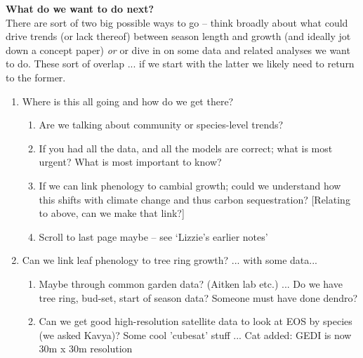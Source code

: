 \documentclass[11pt,letter]{article}
\begin{document}
{\bf What do we want to do next?}\\

There are sort of two big possible ways to go -- think broadly about what could drive trends (or lack thereof) between season length and growth (and ideally jot down a concept paper) \emph{or} or dive in on some data and related analyses we want to do. These sort of overlap ... if we start with the latter we likely need to return to the former.

\begin{enumerate}
\item Where is this all going and how do we get there? 
\begin{enumerate}
\item Are we talking about community or species-level trends?
\item If you had all the data, and all the models are correct; what is most urgent? What is most important to know? 
\item If we can link phenology to cambial growth; could we understand how this shifts with climate change and thus carbon sequestration? [Relating to above, can we make that link?]
\item Scroll to last page maybe -- see `Lizzie’s earlier notes'
\end{enumerate}
\item Can we link leaf phenology to tree ring growth? ... with some data... 
\begin{enumerate}
\item Maybe through common garden data? (Aitken lab etc.) ... Do we have tree ring, bud-set, start of season data? Someone must have done dendro?
\item Can we get good high-resolution satellite data to look at EOS by species (we asked Kavya)? Some cool 'cubesat' stuff ... Cat added: GEDI is now 30m x 30m resolution %
\end{enumerate}
\end{enumerate}
\end{document}
